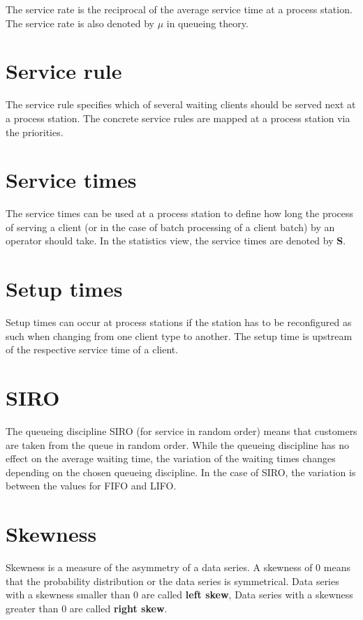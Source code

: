 The service rate is the reciprocal of the average service time at a process station.
The service rate is also denoted by $\mu$ in queueing theory.

\section*{Service rule}


The service rule specifies which of several waiting clients should be served next
at a process station. The concrete service
rules are mapped at a process station via the priorities.

\section*{Service times}


The service times can be used at a process station to define how long
the process of serving a client (or in the case of batch processing of a client batch) by an operator should take.
In the statistics view, the service times are denoted by \textbf{S}.

\section*{Setup times}


Setup times can occur at process stations if the station
has to be reconfigured as such when changing from one client type to another.
The setup time is upstream of the respective service time of a client.

\section*{SIRO}


The queueing discipline SIRO (for service in random order) means that customers are taken from the queue in random order.
While the queueing discipline has no effect on the average waiting time, the variation
of the waiting times changes depending on the chosen queueing discipline.
In the case of SIRO, the variation is between the values for FIFO and LIFO.

\section*{Skewness}


Skewness is a measure of the asymmetry of a data series.
A skewness of 0 means that the probability distribution or the data series is symmetrical.
Data series with a skewness smaller than 0 are called \textbf{left skew},
Data series with a skewness greater than 0 are called \textbf{right skew}.

